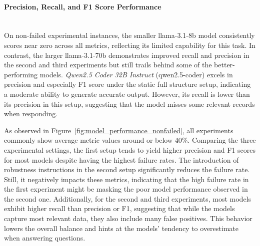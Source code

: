 \documentclass{DESSThesis}
\begin{document}
\paragraph{Precision, Recall, and F1 Score Performance}\mbox{}\\

\noindent On non-failed experimental instances, the smaller llama-3.1-8b model consistently scores near zero across all metrics, reflecting its limited capability for this task. In contrast, the larger llama-3.1-70b demonstrates improved recall and precision in the second and third experiments but still
trails behind some of the better-performing models. \emph{Qwen2.5 Coder 32B Instruct} (qwen2.5-coder) excels in precision and especially F1 score under the static full structure setup, indicating a moderate ability to generate accurate output. However, its recall is lower than its precision in this setup, suggesting that the model misses some relevant records when responding.

As observed in Figure~\ref{fig:model_performance_nonfailed}, all experiments commonly show average metric values around or below 40\%. Comparing the three experimental settings, the first setup tends to yield higher precision and F1 scores for most models despite having the highest failure rates. The introduction of robustness instructions in the second setup significantly reduces the failure rate. Still, it negatively impacts these metrics, indicating that the high failure rate in the first experiment might be masking the poor model performance observed in the second one. Additionally, for the second and third experiments, most models exhibit higher recall than precision or F1, suggesting that while the models capture most relevant data, they also include many false positives. This behavior lowers the overall balance and hints at the models' tendency to overestimate when answering questions.
\end{document}
